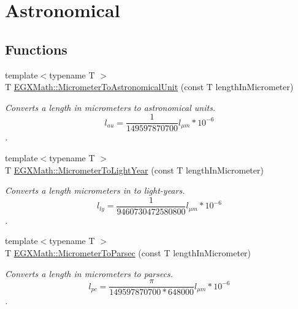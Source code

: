 \hypertarget{group___e_g_x_math-_conversions-_length_conversions-_micrometer-_astronomical}{}\section{Astronomical}
\label{group___e_g_x_math-_conversions-_length_conversions-_micrometer-_astronomical}
\subsection*{Functions}
\begin{DoxyCompactItemize}
\item 
{\footnotesize template$<$typename T $>$ }\\T \mbox{\hyperlink{group___e_g_x_math-_conversions-_length_conversions-_micrometer-_astronomical_ga910b8baeb25ec569394e5563afebc70f}{E\+G\+X\+Math\+::\+Micrometer\+To\+Astronomical\+Unit}} (const T length\+In\+Micrometer)
\begin{DoxyCompactList}\small\item\em Converts a length in micrometers to astronomical units. \[ l_{au}= \frac{1}{149597870700} l_{\mu m} * 10^{-6} \]. \end{DoxyCompactList}\item 
{\footnotesize template$<$typename T $>$ }\\T \mbox{\hyperlink{group___e_g_x_math-_conversions-_length_conversions-_micrometer-_astronomical_ga17ce0795cd099de3fd453a455f0a2260}{E\+G\+X\+Math\+::\+Micrometer\+To\+Light\+Year}} (const T length\+In\+Micrometer)
\begin{DoxyCompactList}\small\item\em Converts a length micrometers in to light-\/years. \[ l_{ly}= \frac{1}{9460730472580800} l_{\mu m} * 10^{-6} \]. \end{DoxyCompactList}\item 
{\footnotesize template$<$typename T $>$ }\\T \mbox{\hyperlink{group___e_g_x_math-_conversions-_length_conversions-_micrometer-_astronomical_gab7d1e9a1568a8691855121c9cf2b38f5}{E\+G\+X\+Math\+::\+Micrometer\+To\+Parsec}} (const T length\+In\+Micrometer)
\begin{DoxyCompactList}\small\item\em Converts a length in micrometers to parsecs. \[ l_{pc}=\frac{\pi}{149597870700 * 648000} l_{\mu m} * 10^{-6} \]. \end{DoxyCompactList}\end{DoxyCompactItemize}


